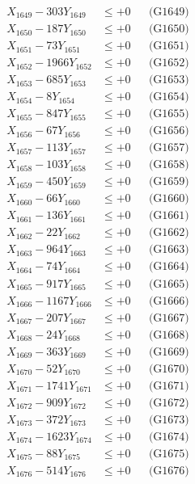 \documentclass[a4paper,10pt]{article}
\begin{document}
{\begin{align}
X_{1649} - 303Y_{1649} &\leq +0 && \text{(G1649)} \\
X_{1650} - 187Y_{1650} &\leq +0 && \text{(G1650)} \\
\allowbreak
X_{1651} - 73Y_{1651} &\leq +0 && \text{(G1651)} \\
X_{1652} - 1966Y_{1652} &\leq +0 && \text{(G1652)} \\
X_{1653} - 685Y_{1653} &\leq +0 && \text{(G1653)} \\
X_{1654} - 8Y_{1654} &\leq +0 && \text{(G1654)} \\
X_{1655} - 847Y_{1655} &\leq +0 && \text{(G1655)} \\
X_{1656} - 67Y_{1656} &\leq +0 && \text{(G1656)} \\
X_{1657} - 113Y_{1657} &\leq +0 && \text{(G1657)} \\
X_{1658} - 103Y_{1658} &\leq +0 && \text{(G1658)} \\
X_{1659} - 450Y_{1659} &\leq +0 && \text{(G1659)} \\
X_{1660} - 66Y_{1660} &\leq +0 && \text{(G1660)} \\
\allowbreak
X_{1661} - 136Y_{1661} &\leq +0 && \text{(G1661)} \\
X_{1662} - 22Y_{1662} &\leq +0 && \text{(G1662)} \\
X_{1663} - 964Y_{1663} &\leq +0 && \text{(G1663)} \\
X_{1664} - 74Y_{1664} &\leq +0 && \text{(G1664)} \\
X_{1665} - 917Y_{1665} &\leq +0 && \text{(G1665)} \\
X_{1666} - 1167Y_{1666} &\leq +0 && \text{(G1666)} \\
X_{1667} - 207Y_{1667} &\leq +0 && \text{(G1667)} \\
X_{1668} - 24Y_{1668} &\leq +0 && \text{(G1668)} \\
X_{1669} - 363Y_{1669} &\leq +0 && \text{(G1669)} \\
X_{1670} - 52Y_{1670} &\leq +0 && \text{(G1670)} \\
\allowbreak
X_{1671} - 1741Y_{1671} &\leq +0 && \text{(G1671)} \\
X_{1672} - 909Y_{1672} &\leq +0 && \text{(G1672)} \\
X_{1673} - 372Y_{1673} &\leq +0 && \text{(G1673)} \\
X_{1674} - 1623Y_{1674} &\leq +0 && \text{(G1674)} \\
X_{1675} - 88Y_{1675} &\leq +0 && \text{(G1675)} \\
X_{1676} - 514Y_{1676} &\leq +0 && \text{(G1676)} \\

\end{align}}
\end{document}
